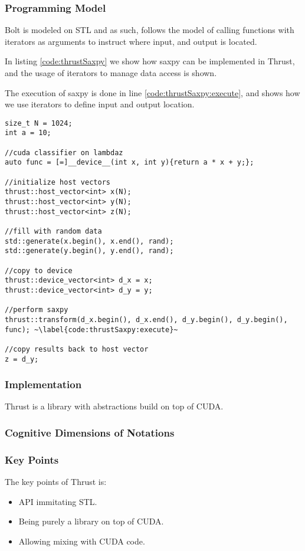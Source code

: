 \subsubsection{Programming Model}
Bolt is modeled on STL and as such, follows the model of calling functions with iterators as arguments to instruct where input, and output is located.

In listing \ref{code:thrustSaxpy} we show how saxpy can be implemented in Thrust, and the usage of iterators to manage data access is shown.

The execution of saxpy is done in line \ref{code:thrustSaxpy:execute}, and shows how we use iterators to define input and output location.
\begin{lstlisting}[caption={Thrust saxpy example}, label={code:thrustSaxpy}]
size_t N = 1024;
int a = 10;

//cuda classifier on lambdaz
auto func = [=]__device__(int x, int y){return a * x + y;};

//initialize host vectors
thrust::host_vector<int> x(N);
thrust::host_vector<int> y(N);
thrust::host_vector<int> z(N);

//fill with random data
std::generate(x.begin(), x.end(), rand);
std::generate(y.begin(), y.end(), rand);

//copy to device
thrust::device_vector<int> d_x = x;
thrust::device_vector<int> d_y = y;

//perform saxpy
thrust::transform(d_x.begin(), d_x.end(), d_y.begin(), d_y.begin(), func); ~\label{code:thrustSaxpy:execute}~

//copy results back to host vector
z = d_y;
\end{lstlisting}

\subsubsection{Implementation}
Thrust is a library with abstractions build on top of CUDA.

\subsubsection{Cognitive Dimensions of Notations}

\subsubsection{Key Points}
The key points of Thrust is:

\begin{itemize}
\item API immitating STL.
\item Being purely a library on top of CUDA.
\item Allowing mixing with CUDA code. 
\end{itemize}

